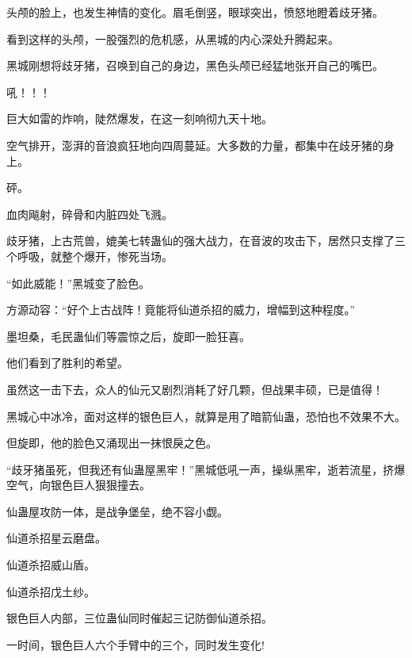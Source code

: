 \begin{this_body}
头颅的脸上，也发生神情的变化。眉毛倒竖，眼球突出，愤怒地瞪着歧牙猪。

看到这样的头颅，一股强烈的危机感，从黑城的内心深处升腾起来。

黑城刚想将歧牙猪，召唤到自己的身边，黑色头颅已经猛地张开自己的嘴巴。

吼！！！

巨大如雷的炸响，陡然爆发，在这一刻响彻九天十地。

空气排开，澎湃的音浪疯狂地向四周蔓延。大多数的力量，都集中在歧牙猪的身上。

砰。

血肉飚射，碎骨和内脏四处飞溅。

歧牙猪，上古荒兽，媲美七转蛊仙的强大战力，在音波的攻击下，居然只支撑了三个呼吸，就整个爆开，惨死当场。

“如此威能！”黑城变了脸色。

方源动容：“好个上古战阵！竟能将仙道杀招的威力，增幅到这种程度。”

墨坦桑，毛民蛊仙们等震惊之后，旋即一脸狂喜。

他们看到了胜利的希望。

虽然这一击下去，众人的仙元又剧烈消耗了好几颗，但战果丰硕，已是值得！

黑城心中冰冷，面对这样的银色巨人，就算是用了暗箭仙蛊，恐怕也不效果不大。

但旋即，他的脸色又涌现出一抹恨戾之色。

“歧牙猪虽死，但我还有仙蛊屋黑牢！”黑城低吼一声，操纵黑牢，逝若流星，挤爆空气，向银色巨人狠狠撞去。

仙蛊屋攻防一体，是战争堡垒，绝不容小觑。

仙道杀招星云磨盘。

仙道杀招威山盾。

仙道杀招戊土纱。

银色巨人内部，三位蛊仙同时催起三记防御仙道杀招。

一时间，银色巨人六个手臂中的三个，同时发生变化!

\end{this_body}

